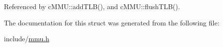 \-Referenced by c\-M\-M\-U\-::add\-T\-L\-B(), and c\-M\-M\-U\-::flush\-T\-L\-B().



\-The documentation for this struct was generated from the following file\-:\begin{DoxyCompactItemize}
\item 
include/\hyperlink{mmu_8h}{mmu.\-h}\end{DoxyCompactItemize}
